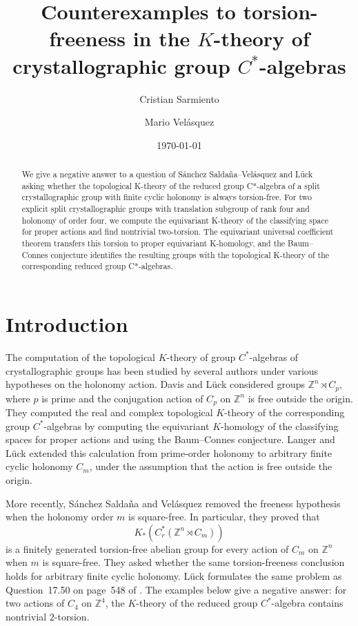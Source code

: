 \documentclass[11pt]{amsart}
\title[Torsion in crystallographic group $C^*$-algebras]{Counterexamples to torsion-freeness in the
$K$-theory of crystallographic group $C^*$-algebras}
\author{Cristian Sarmiento}
\author{Mario Vel\'asquez}
\date{\today}
\newcommand{\Z}{\mathbb Z}
\theoremstyle{remark}
\numberwithin{equation}{section}
\begin{document}
\begin{abstract}
We give a negative answer to a question of S\'anchez Salda\~na--Vel\'asquez and L\"uck asking whether the topological K-theory of the reduced group C*-algebra of a split crystallographic group with finite cyclic
holonomy is always torsion-free. For two explicit split
crystallographic groups with translation subgroup of rank four and holonomy of order four, we compute the equivariant K-theory  of the classifying space for proper actions and find nontrivial two-torsion. The equivariant universal coefficient theorem transfers this torsion to proper equivariant K-homology, and the Baum--Connes conjecture identifies the resulting groups with the topological K-theory of the corresponding reduced group C*-algebras.
\end{abstract}
\maketitle

\section{Introduction}

The computation of the topological $K$-theory of group $C^*$-algebras of crystallographic groups has been studied by several authors under various hypotheses on the holonomy action. Davis and L\"uck \cite{DL} considered groups $\Z^n\rtimes C_p$, where $p$ is prime and the conjugation action of $C_p$ on $\Z^n$ is free outside the origin. They computed the real and complex topological $K$-theory of the corresponding group $C^*$-algebras by computing the equivariant $K$-homology of the classifying spaces for proper actions and using the Baum--Connes conjecture. Langer and L\"uck \cite{LL} extended this calculation from prime-order holonomy to arbitrary finite cyclic holonomy $C_m$, under the assumption that the action is free outside the origin.

More recently, S\'anchez Salda\~na and Vel\'asquez \cite{SV} removed the freeness hypothesis when the holonomy order $m$ is square-free. In particular, they proved that
\[
 K_*(C_r^*(\Z^n\rtimes C_m))
\]
is a finitely generated torsion-free abelian group for every action of $C_m$ on $\Z^n$ when $m$ is square-free. They asked whether the same torsion-freeness conclusion holds for arbitrary finite cyclic holonomy. L\"uck formulates the same problem as Question~17.50 on page~548 of \cite{LuckBook}. The examples below give a negative answer: for two actions of $C_4$ on $\Z^4$, the $K$-theory of the reduced group $C^*$-algebra contains nontrivial $2$-torsion. 
\end{document}
